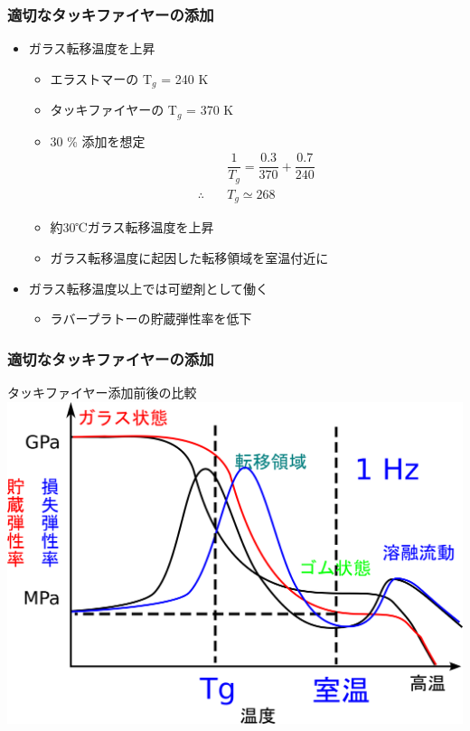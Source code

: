 \documentclass[unicode,12pt]{beamer}%
\begin{document}
\begin{frame}
	\frametitle{適切なタッキファイヤーの添加}

	\begin{itemize}
		\item ガラス転移温度を上昇
		\begin{itemize}
			\item エラストマーの T$_g$ = 240 K
			\item タッキファイヤーの T$_g$ = 370 K
			\item 30 \% 添加を想定
			\begin{align*}
				&\dfrac{1}{T_g} = \dfrac{0.3}{370} + \dfrac{0.7}{240} \\
				\therefore \quad &T_g \simeq 268
			\end{align*}
			\item 約30℃ガラス転移温度を上昇
			\item ガラス転移温度に起因した\alert{転移領域を室温付近}に
		\end{itemize}
		\item \alert{ガラス転移温度以上では可塑剤}として働く
		\begin{itemize}
			\item ラバープラトーの\alert{貯蔵弾性率を低下}
		\end{itemize}
	\end{itemize}
\end{frame}

\begin{frame}
	\frametitle{適切なタッキファイヤーの添加}
		\large{\alert{タッキファイヤー添加前後の比較}}
		\vspace{5mm}
			\centering
				\includegraphics[width=.8\textwidth]{dynamic_ViscoElast_Temp_rubber_tack.png}
\end{frame}
\end{document}
